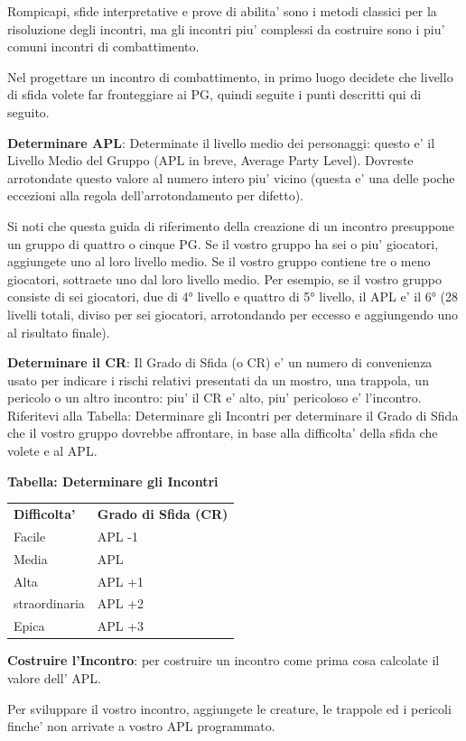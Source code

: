 \documentclass[a4paper,11pt,twoside,openany]{book}
\begin{document}
{Rompicapi, sfide interpretative e prove di abilita' sono i metodi classici per la risoluzione degli incontri, ma gli incontri piu' complessi da costruire sono i piu' comuni incontri di combattimento.

Nel progettare un incontro di combattimento, in primo luogo decidete che livello di sfida volete far fronteggiare ai PG, quindi seguite i punti descritti qui di seguito.

\textbf{Determinare APL}: Determinate il livello medio dei personaggi: questo e' il Livello Medio del Gruppo (APL in breve, Average Party Level). Dovreste arrotondate questo valore al numero intero piu' vicino (questa e' una delle poche eccezioni alla regola dell'arrotondamento per difetto).

Si noti che questa guida di riferimento della creazione di un incontro presuppone un gruppo di quattro o cinque PG. Se il vostro gruppo ha sei o piu' giocatori, aggiungete uno al loro livello medio. Se il vostro gruppo contiene tre o meno giocatori, sottraete uno dal loro livello medio. Per esempio, se il vostro gruppo consiste di sei giocatori, due di 4° livello e quattro di 5° livello, il APL e' il 6° (28 livelli totali, diviso per sei giocatori, arrotondando per eccesso e aggiungendo uno al risultato finale).

\textbf{Determinare il CR}: Il Grado di Sfida (o CR) e' un numero di convenienza usato per indicare i rischi relativi presentati da un mostro, una trappola, un pericolo o un altro incontro: piu' il CR e' alto, piu' pericoloso e' l'incontro. Riferitevi alla Tabella: Determinare gli Incontri per determinare il Grado di Sfida che il vostro gruppo dovrebbe affrontare, in base alla difficolta' della sfida che volete e al APL.

\bigskip

\textbf{Tabella: Determinare gli Incontri}

\begin{tabular}{ll}
\toprule
\textbf{Difficolta'} & \textbf{Grado di Sfida (CR)}\tabularnewline
Facile & APL -1\tabularnewline
Media & APL\tabularnewline
Alta & APL +1\tabularnewline
straordinaria & APL +2\tabularnewline
Epica & APL +3\tabularnewline
\end{tabular}

\bigskip

\textbf{Costruire l'Incontro}: per costruire un incontro come prima cosa calcolate il valore dell' APL.

Per sviluppare il vostro incontro, aggiungete le creature, le trappole ed i pericoli finche' non arrivate a vostro APL programmato.

}
\end{document}

